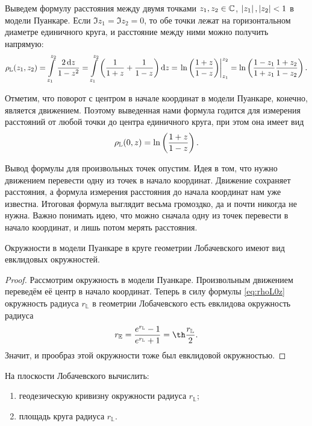 Выведем формулу расстояния между двумя точками $z_1, z_2 \in \mathbb{C}$, $\left\lvert z_1\right\rvert, \left\lvert z_2\right\rvert < 1$ в модели Пуанкаре. Если $\Im z_1 = \Im z_2 = 0$, то обе точки лежат на горизонтальном диаметре единичного круга, и расстояние между ними можно получить напрямую:
\[
	\rho_{\mathbb{L}}(z_1, z_2) = \int\limits_{z_1}^{z_2}\frac{2\mathop{}\!\mathrm{d} z}{1 - z^2} = \int\limits_{z_1}^{z_2}\left(\frac{1}{1 + z} + \frac{1}{1 - z}\right)\mathop{}\!\mathrm{d} z = \left.\ln\left(\frac{1 + z}{1 - z}\right)\right|_{z_1}^{z_2} = \ln\left(\frac{1 - z_1}{1 + z_1}\frac{1 + z_2}{1 - z_2}\right).
\]

Отметим, что поворот с центром в начале координат в модели Пуанкаре, конечно, является движением. Поэтому выведенная нами формула годится для измерения расстояний от любой точки до центра единичного круга, при этом она имеет вид
\begin{equation} \label{eq:rhoL0z}
	\rho_{\mathbb{L}}(0, z) = \ln\left(\frac{1 + z}{1 - z}\right).
\end{equation}

Вывод формулы для произвольных точек опустим. Идея в том, что нужно движением перевести одну из точек в начало координат. Движение сохраняет расстояния, а формула измерения расстояния до начала координат нам уже известна. Итоговая формула выглядит весьма громоздко, да и почти никогда не нужна. Важно понимать идею, что можно сначала одну из точек перевести в начало координат, и лишь потом мерять расстояния.

\begin{proposition}
	Окружности в модели Пуанкаре в круге геометрии Лобачевского имеют вид евклидовых окружностей.
\end{proposition}

\begin{proof}
	Рассмотрим окружность в модели Пуанкаре. Произвольным движением переведём её центр в начало координат. Теперь в силу формулы \eqref{eq:rhoL0z} окружность радиуса $r_{\mathbb{L}}$ в геометрии Лобачевского есть евклидова окружность радиуса
	\begin{equation} \label{eq:LtoE}
		r_{\mathbb{E}} = \frac{e^{r_{\mathbb{L}}} - 1}{e^{r_{\mathbb{L}}} + 1} = \th\frac{r_{\mathbb{L}}}{2}.
	\end{equation}
	Значит, и прообраз этой окружности тоже был евклидовой окружностью.
\end{proof}

\begin{problem}
	На плоскости Лобачевского вычислить:
	\begin{enumerate}[nolistsep, label=(\arabic*)]
		\item геодезическую кривизну окружности радиуса $r_{\mathbb{L}}$;
		\item площадь круга радиуса $r_{\mathbb{L}}$.
	\end{enumerate}
\end{problem}

